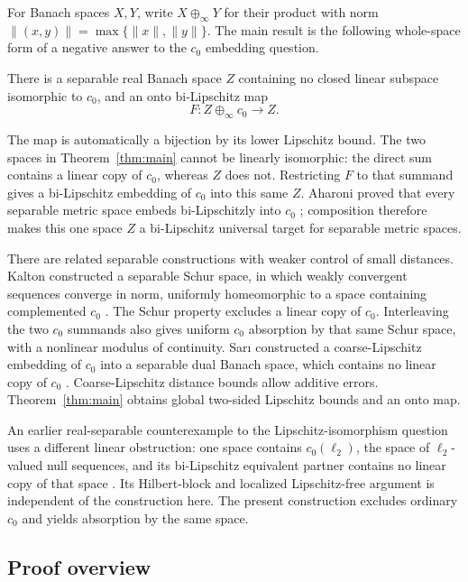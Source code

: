 For Banach spaces \(X,Y\), write \(X\oplus_\infty Y\) for their product
with norm \(\|(x,y)\|=\max\{\|x\|,\|y\|\}\). The main result is the
following whole-space form of a negative answer to the \(c_0\)
embedding question.

\begin{theorem}\label{thm:main}
There is a separable real Banach space \(Z\) containing no closed linear
subspace isomorphic to \(c_0\), and an onto bi-Lipschitz map
\[
                 F:Z\oplus_\infty c_0\longrightarrow Z.
\]
\end{theorem}

The map is automatically a bijection by its lower Lipschitz bound.
The two spaces in Theorem~\ref{thm:main} cannot be linearly isomorphic:
the direct sum contains a linear copy of \(c_0\), whereas \(Z\) does
not. Restricting \(F\) to that summand gives a bi-Lipschitz embedding
of \(c_0\) into this same \(Z\). Aharoni proved that every separable
metric space embeds bi-Lipschitzly into \(c_0\) \cite{Aharoni74};
composition therefore makes this one space \(Z\) a bi-Lipschitz
universal target for separable metric spaces.

There are related separable constructions with weaker control of
small distances. Kalton constructed a separable Schur space, in which
weakly convergent sequences converge in norm, uniformly homeomorphic
to a space containing complemented \(c_0\)
\cite[Theorem~4.6 and Propositions~5.1--5.2]{Kalton04}.
The Schur property excludes a linear copy of \(c_0\).
Interleaving the two \(c_0\) summands also gives uniform \(c_0\) absorption
by that same Schur space, with a nonlinear modulus of continuity.
Sar{\i} constructed a coarse-Lipschitz embedding of \(c_0\) into a
separable dual Banach space, which contains no linear copy of \(c_0\)
\cite[Introduction and Theorem~5]{Sari26}. Coarse-Lipschitz distance
bounds allow additive errors. Theorem~\ref{thm:main} obtains global
two-sided Lipschitz bounds and an onto map.

An earlier real-separable counterexample to the Lipschitz-isomorphism
question uses a different linear obstruction: one space contains
\(c_0(\ell_2)\), the space of \(\ell_2\)-valued null sequences, and
its bi-Lipschitz equivalent partner contains no linear copy of that
space \cite[Theorem~1.1]{OpenAI2026Baseline}. Its Hilbert-block and
localized Lipschitz-free argument is independent of the construction
here. The present construction excludes ordinary \(c_0\) and yields
absorption by the same space.

\subsection*{Proof overview}


